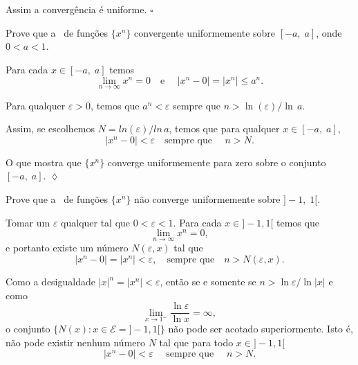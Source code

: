 Assim a convergência é uniforme. \hfill \(\square\)

\begin{exer}
Prove que a \seq\ de funções $\{x^n\}$ convergente uniformemente
sobre $[-a,\; a]$, onde $0<a<1$.
\end{exer}

\solo Para cada $x\in [-a,\; a]$ temos
\begin{equation*}
    \lim_{n\to\infty} x^n=0\quad \text{e }\quad |x^n-0|=|x^n|\leq
    a^n.
\end{equation*}

Para qualquer $\varepsilon>0$, temos que $a^n<\varepsilon$ sempre
que $n>\ln(\varepsilon)/\ln\, a$.

Assim, se escolhemos $N=ln(\varepsilon)/ln\, a$, temos que para
qualquer $x\in [-a,\; a]$,
\begin{equation*}
    |x^n-0|<\varepsilon\quad \text{sempre que }\quad n>N.
\end{equation*}

O que mostra que $\{x^n\}$ converge uniformemente para zero sobre
o conjunto $[-a, \; a]$. \hfill \(\lozenge\)

\begin{exer}
Prove que a \seq\ de funções $\{x^n\}$ não converge uniformemente
 sobre $]-1, \; 1[$.
\end{exer}

\solo Tomar um $\varepsilon$ qualquer tal que $0<\varepsilon<1$.
Para cada $x\in ]-1,1[$ temos que
\begin{equation*}
    \lim_{n\to\infty}x^n=0,
\end{equation*}
e portanto existe um número $N(\varepsilon,x)$ tal que
\begin{equation*}
    |x^n-0|=|x^n|<\varepsilon,\quad \text{sempre que}\quad n>N(\varepsilon, x).
\end{equation*}

Como a desigualdade $|x|^n=|x^n|<\varepsilon$, então se e somente se $n>\ln
\varepsilon/\ln |x|$ e como
\begin{equation*}
    \lim_{x\to 1^{-}}\frac{\ln \varepsilon}{\ln x}=\infty,
\end{equation*}
o conjunto $\{N(x)\colon x\in \mathcal{E}=]-1,1[\}$ não pode ser
acotado superiormente. Isto é, não pode existir nenhum número $N$
tal que para todo $x\in ]-1,1[$
\begin{equation*}
    |x^n-0|<\varepsilon\quad \text{ sempre que }\quad n>N.
\end{equation*}

